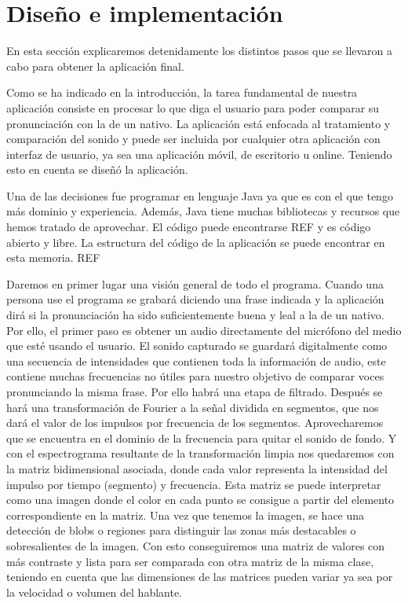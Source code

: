 
\chapter{Diseño e implementación} %

\label{Chapter2} %

En esta sección explicaremos detenidamente los distintos pasos que se llevaron a cabo para obtener la aplicación final. 

Como se ha indicado en la introducción, la tarea fundamental de nuestra aplicación consiste en procesar lo que diga el usuario para poder comparar su pronunciación con la de un nativo. La aplicación está enfocada al tratamiento y comparación del sonido y puede ser incluida por cualquier otra aplicación con interfaz de usuario, ya sea una aplicación móvil, de escritorio u online. Teniendo esto en cuenta se diseñó la aplicación.

Una de las decisiones fue programar en lenguaje Java ya que es con el que tengo más dominio y experiencia. Además, Java tiene muchas bibliotecas y recursos que hemos tratado de aprovechar. El código puede encontrarse REF \cite{REF} %
 y es código abierto y libre. La estructura del código de la aplicación se puede encontrar en esta memoria. REF \cite{REF} %

Daremos en primer lugar una visión general de todo el programa. Cuando una persona use el programa se grabará diciendo una frase indicada y la aplicación dirá si la pronunciación ha sido suficientemente buena y leal a la de un nativo. Por ello, el primer paso es obtener un audio directamente del micrófono del medio que esté usando el usuario. El sonido capturado se guardará digitalmente como una secuencia de intensidades que contienen toda la información de audio, este contiene muchas frecuencias no útiles para nuestro objetivo de comparar voces pronunciando la misma frase. Por ello habrá una etapa de filtrado. Después se hará una transformación de Fourier a la señal dividida en segmentos, que nos dará el valor de los impulsos por frecuencia de los segmentos. Aprovecharemos que se encuentra en el dominio de la frecuencia para quitar el sonido de fondo. Y con el espectrograma resultante de la transformación limpia nos quedaremos con la matriz bidimensional asociada, donde cada valor representa la intensidad del impulso por tiempo (segmento) y frecuencia. Esta matriz se puede interpretar como una imagen donde el color en cada punto se consigue a partir del elemento correspondiente en la matriz. Una vez que tenemos la imagen, se hace una detección de blobs o regiones para distinguir las zonas más destacables o sobresalientes de la imagen. Con esto conseguiremos una matriz de valores con más contraste y lista para ser comparada con otra matriz de la misma clase, teniendo en cuenta que las dimensiones de las matrices pueden variar ya sea por la velocidad o volumen del hablante.

